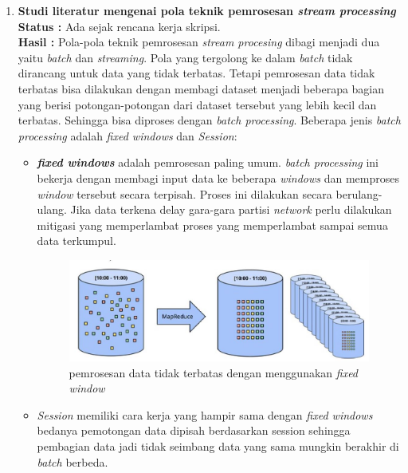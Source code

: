 \documentclass[a4paper,twoside]{article}
\begin{document}
\begin{enumerate}
		\item \textbf{Studi literatur mengenai pola teknik pemrosesan \textit{stream processing}}\\
		{\bf Status :} Ada sejak rencana kerja skripsi.\\
		{\bf Hasil :} Pola-pola teknik pemrosesan \textit{stream procesing} dibagi menjadi dua yaitu
		\textit{batch} dan \textit{streaming}. Pola yang tergolong ke dalam \textit{batch} tidak 				dirancang untuk data yang tidak terbatas. Tetapi pemrosesan data tidak terbatas bisa 					dilakukan dengan membagi dataset menjadi beberapa bagian yang berisi potongan-potongan dari 			dataset tersebut yang lebih kecil dan terbatas. Sehingga bisa diproses dengan \textit{batch 			processing}. 
		Beberapa jenis \textit{batch processing} adalah \textit{fixed windows} dan \textit{Session}:
		\begin{itemize}
			\item{\textbf{\textit{fixed windows}} adalah pemrosesan paling umum. \textit{batch 						processing} ini bekerja dengan membagi input data ke beberapa \textit{windows} dan 						memproses \textit{window} tersebut secara terpisah. Proses ini dilakukan secara 						berulang-ulang. Jika data terkena delay gara-gara partisi \textit{network} perlu 						dilakukan mitigasi yang memperlambat proses yang memperlambat sampai semua data 						terkumpul.
			\begin{figure}[H] 
					\centering  
					\includegraphics[scale=0.5]{3-fixed-windows}  
					\caption[Gambar {\it fixed-windowa}]{pemrosesan data tidak terbatas dengan 								menggunakan \textit{fixed window}} 
					\label{fig:processing-events relationship} 
					\end{figure} 			
			} 
			
			\item{\textit{Session} memiliki cara kerja yang hampir sama dengan \textit{fixed 						windows} bedanya pemotongan data dipisah berdasarkan session sehingga pembagian data 					jadi tidak seimbang data yang sama mungkin berakhir di \textit{batch} berbeda.}
		\end{itemize}
		

\end{enumerate}
\end{document}
